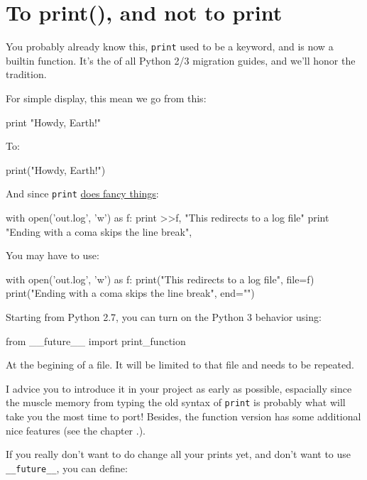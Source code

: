 \section{To print(), and not to print}

You probably already know this, \lstinline{print} used to be a \gls{keyword}, and is now a \gls{builtin} function. It's the  of all Python 2/3 migration guides, and we'll honor the tradition.

For simple display, this mean we go from this:

\begin{py2}
print "Howdy, Earth!"
\end{py2}

To:

\begin{py3}
print("Howdy, Earth!")
\end{py3}

And since \lstinline{print} \href{https://www.python.org/dev/peps/pep-0214/}{does fancy things}:

\begin{py2}
with open('out.log', 'w') as f:
    print >>f, "This redirects to a log file"
print "Ending with a coma skips the line break",
\end{py2}

You may have to use:

\begin{py3}
with open('out.log', 'w') as f:
    print("This redirects to a log file", file=f)
print("Ending with a coma skips the line break", end="")
\end{py3}

Starting from Python 2.7, you can turn on the Python 3 behavior using:

\begin{py2and3}
from __future__ import print_function
\end{py2and3}

At the begining of a file. It will be limited to that file and needs to be repeated.

I advice you to introduce it in your project as early as possible, espacially since the muscle memory from typing the old syntax of \lstinline{print} is probably what will take you the most time to port! Besides, the function version has some additional nice features (see the chapter .).

If you really don't want to do change all your prints yet, and don't want to use \lstinline{__future__}, you can define:

